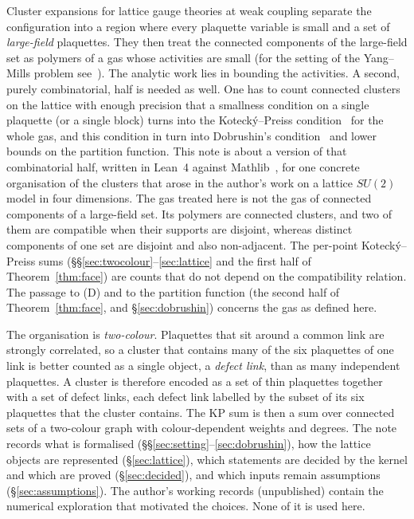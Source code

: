 \documentclass[11pt,a4paper]{article}
\theoremstyle{definition}
\theoremstyle{remark}
\begin{document}
Cluster expansions for lattice gauge theories at weak coupling separate the configuration into a region where every plaquette variable is small and a set of \emph{large-field} plaquettes. They then treat the connected components of the large-field set as polymers of a gas whose activities are small (for the setting of the Yang--Mills problem see~\cite{JW}). The analytic work lies in bounding the activities. A second, purely combinatorial, half is needed as well. One has to count connected clusters on the lattice with enough precision that a smallness condition on a single plaquette (or a single block) turns into the Kotecký--Preiss condition~\cite{KP} for the whole gas, and this condition in turn into Dobrushin's condition~\cite{Do} and lower bounds on the partition function. This note is about a version of that combinatorial half, written in Lean~4 against Mathlib~\cite{Mathlib}, for one concrete organisation of the clusters that arose in the author's work on a lattice $SU(2)$ model in four dimensions. The gas treated here is not the gas of connected components of a large-field set. Its polymers are connected clusters, and two of them are compatible when their supports are disjoint, whereas distinct components of one set are disjoint and also non-adjacent. The per-point Kotecký--Preiss sums (\S\S\ref{sec:twocolour}--\ref{sec:lattice} and the first half of Theorem~\ref{thm:face}) are counts that do not depend on the compatibility relation. The passage to (D) and to the partition function (the second half of Theorem~\ref{thm:face}, and \S\ref{sec:dobrushin}) concerns the gas as defined here.

The organisation is \emph{two-colour}. Plaquettes that sit around a common link are strongly correlated, so a cluster that contains many of the six plaquettes of one link is better counted as a single object, a \emph{defect link}, than as many independent plaquettes. A cluster is therefore encoded as a set of thin plaquettes together with a set of defect links, each defect link labelled by the subset of its six plaquettes that the cluster contains. The KP sum is then a sum over connected sets of a two-colour graph with colour-dependent weights and degrees. The note records what is formalised (\S\S\ref{sec:setting}--\ref{sec:dobrushin}), how the lattice objects are represented (\S\ref{sec:lattice}), which statements are decided by the kernel and which are proved (\S\ref{sec:decided}), and which inputs remain assumptions (\S\ref{sec:assumptions}). The author's working records (unpublished) contain the numerical exploration that motivated the choices. None of it is used here.
\end{document}
